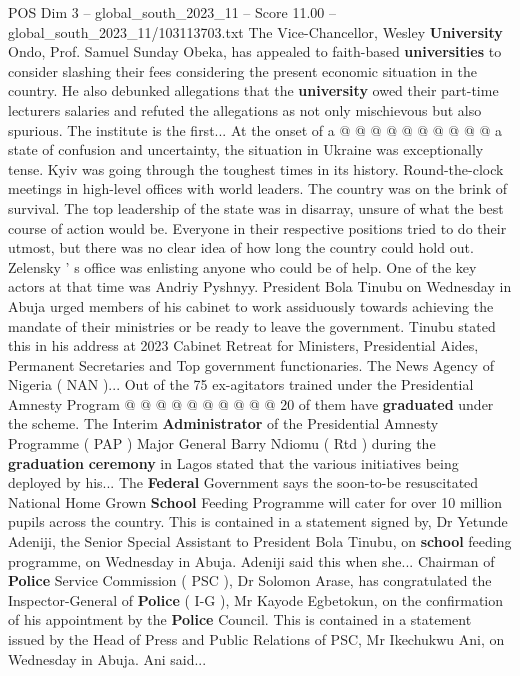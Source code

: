 \begin{textsample}{POS Dim 3 – global\_south\_2023\_11 – Score 11.00 – global\_south\_2023\_11/103113703.txt}
The Vice-Chancellor, Wesley \textbf{University} Ondo, Prof.
Samuel Sunday Obeka, has appealed to faith-based \textbf{universities} to consider slashing their fees considering the present economic situation in the country.
He also debunked allegations that the \textbf{university} owed their part-time lecturers salaries and refuted the allegations as not only mischievous but also spurious.
The institute is the first...
At the onset of a @ @ @ @ @ @ @ @ @ @ a state of confusion and uncertainty, the situation in Ukraine was exceptionally tense.
Kyiv was going through the toughest times in its history.
Round-the-clock meetings in high-level offices with world leaders.
The country was on the brink of survival.
The top leadership of the state was in disarray, unsure of what the best course of action would be.
Everyone in their respective positions tried to do their utmost, but there was no clear idea of how long the country could hold out.
Zelensky ' s office was enlisting anyone who could be of help.
One of the key actors at that time was Andriy Pyshnyy.
President Bola Tinubu on Wednesday in Abuja urged members of his cabinet to work assiduously towards achieving the mandate of their ministries or be ready to leave the government.
Tinubu stated this in his address at 2023 Cabinet Retreat for Ministers, Presidential Aides, Permanent Secretaries and Top government functionaries.
The News Agency of Nigeria ( NAN )...
Out of the 75 ex-agitators trained under the Presidential Amnesty Program @ @ @ @ @ @ @ @ @ @ 20 of them have \textbf{graduated} under the scheme.
The Interim \textbf{Administrator} of the Presidential Amnesty Programme ( PAP ) Major General Barry Ndiomu ( Rtd ) during the \textbf{graduation} \textbf{ceremony} in Lagos stated that the various initiatives being deployed by his...
The \textbf{Federal} Government says the soon-to-be resuscitated National Home Grown \textbf{School} Feeding Programme will cater for over 10 million pupils across the country.
This is contained in a statement signed by, Dr Yetunde Adeniji, the Senior Special Assistant to President Bola Tinubu, on \textbf{school} feeding programme, on Wednesday in Abuja.
Adeniji said this when she...
Chairman of \textbf{Police} Service Commission ( PSC ), Dr Solomon Arase, has congratulated the Inspector-General of \textbf{Police} ( I-G ), Mr Kayode Egbetokun, on the confirmation of his appointment by the \textbf{Police} Council.
This is contained in a statement issued by the Head of Press and Public Relations of PSC, Mr Ikechukwu Ani, on Wednesday in Abuja.
Ani said...

\end{textsample}
